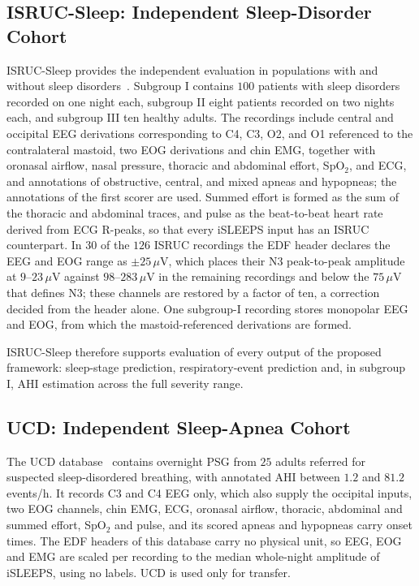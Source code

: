 \documentclass{ieeeaccess}
\begin{document}
\subsection{ISRUC-Sleep: Independent Sleep-Disorder Cohort}

ISRUC-Sleep provides the independent evaluation in populations with and without
sleep disorders~\cite{khalighi2016isruc}. Subgroup I contains $100$ patients with
sleep disorders recorded on one night each, subgroup II eight patients recorded
on two nights each, and subgroup III ten healthy adults. The recordings include
central and occipital EEG derivations corresponding to C4, C3, O2, and O1
referenced to the contralateral mastoid, two EOG derivations and chin EMG,
together with oronasal airflow, nasal pressure, thoracic and abdominal effort,
SpO$_2$, and ECG, and annotations of obstructive, central, and mixed apneas and
hypopneas; the annotations of the first scorer are used. Summed effort is formed
as the sum of the thoracic and abdominal traces, and pulse as the beat-to-beat
heart rate derived from ECG R-peaks, so that every iSLEEPS input has an ISRUC
counterpart. In $30$ of the $126$ ISRUC recordings the EDF header declares the
EEG and EOG range as $\pm25\,\mu$V, which places their N3 peak-to-peak amplitude
at $9$--$23\,\mu$V against $98$--$283\,\mu$V in the remaining recordings and below
the $75\,\mu$V that defines N3; these channels are restored by a factor of ten, a
correction decided from the header alone. One subgroup-I recording stores
monopolar EEG and EOG, from which the mastoid-referenced derivations are formed.

ISRUC-Sleep therefore supports evaluation of every output of the proposed
framework: sleep-stage prediction, respiratory-event prediction and, in subgroup I,
AHI estimation across the full severity range.

\subsection{UCD: Independent Sleep-Apnea Cohort}

The UCD database~\cite{ucddb2007,goldberger2000physionet} contains overnight PSG
from $25$ adults referred for suspected sleep-disordered breathing, with annotated
AHI between $1.2$ and $81.2$ events/h. It records C3 and C4 EEG only, which also
supply the occipital inputs, two EOG channels, chin EMG, ECG, oronasal airflow,
thoracic, abdominal and summed effort, SpO$_2$ and pulse, and its scored apneas
and hypopneas carry onset times. The EDF headers of this database carry no physical
unit, so EEG, EOG and EMG are scaled per recording to the median whole-night
amplitude of iSLEEPS, using no labels. UCD is used only for transfer.
\end{document}
